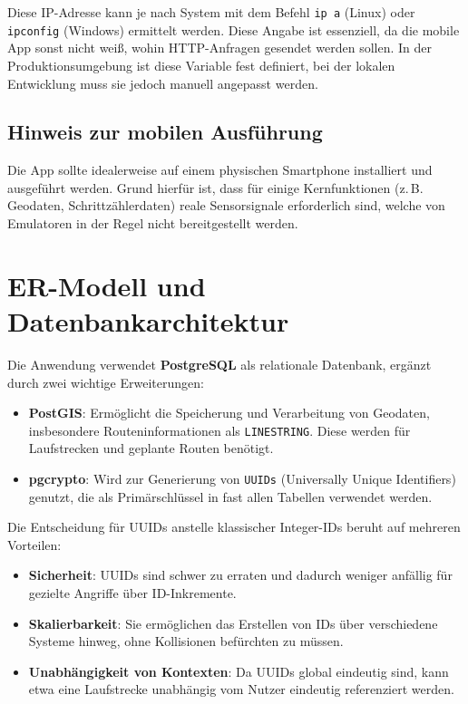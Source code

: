 \documentclass[11pt,a4paper]{article}
\begin{document}
Diese IP-Adresse kann je nach System mit dem Befehl \texttt{ip a} (Linux) oder \texttt{ipconfig} (Windows) ermittelt werden. Diese Angabe ist essenziell, da die mobile App sonst nicht weiß, wohin HTTP-Anfragen gesendet werden sollen. In der Produktionsumgebung ist diese Variable fest definiert, bei der lokalen Entwicklung muss sie jedoch manuell angepasst werden.

\subsection*{Hinweis zur mobilen Ausführung}

Die App sollte idealerweise auf einem physischen Smartphone installiert und ausgeführt werden. Grund hierfür ist, dass für einige Kernfunktionen (z.\,B. Geodaten, Schrittzählerdaten) reale Sensorsignale erforderlich sind, welche von Emulatoren in der Regel nicht bereitgestellt werden.

\section{ER-Modell und Datenbankarchitektur}

Die Anwendung verwendet \textbf{PostgreSQL} als relationale Datenbank, ergänzt durch zwei wichtige Erweiterungen:

\begin{itemize}
    \item \textbf{PostGIS}: Ermöglicht die Speicherung und Verarbeitung von Geodaten, insbesondere Routeninformationen als \texttt{LINESTRING}. Diese werden für Laufstrecken und geplante Routen benötigt.
    \item \textbf{pgcrypto}: Wird zur Generierung von \texttt{UUIDs} (Universally Unique Identifiers) genutzt, die als Primärschlüssel in fast allen Tabellen verwendet werden.
\end{itemize}

Die Entscheidung für UUIDs anstelle klassischer Integer-IDs beruht auf mehreren Vorteilen:
\begin{itemize}
    \item \textbf{Sicherheit}: UUIDs sind schwer zu erraten und dadurch weniger anfällig für gezielte Angriffe über ID-Inkremente.
    \item \textbf{Skalierbarkeit}: Sie ermöglichen das Erstellen von IDs über verschiedene Systeme hinweg, ohne Kollisionen befürchten zu müssen.
    \item \textbf{Unabhängigkeit von Kontexten}: Da UUIDs global eindeutig sind, kann etwa eine Laufstrecke unabhängig vom Nutzer eindeutig referenziert werden.
\end{itemize}
\end{document}

